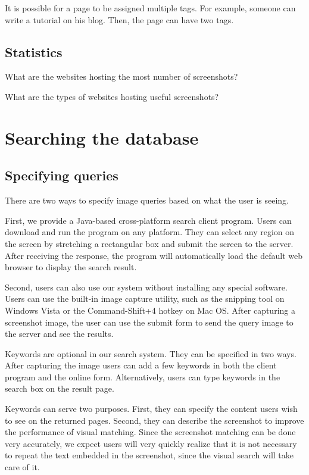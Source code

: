 \documentclass{www2010-submission}
\begin{document}
It is possible for a page to be assigned multiple tags. For
example, someone can write a tutorial on his blog. Then, the page
can have two tags.

\subsection{Statistics}

What are the websites hosting the most number of screenshots?

What are the types of websites hosting useful screenshots?


\section{Searching the database}

\subsection{Specifying queries}

There are two ways to specify image queries based on what the user
is seeing.

First, we provide a Java-based cross-platform search client
program. Users can download and run the program on any platform.
They can select any region on the screen by stretching a
rectangular box and submit the screen to the server. After
receiving the response, the program will automatically load the
default web browser to display the search result.

Second, users can also use our system without installing any
special software. Users can use the built-in image capture
utility, such as the snipping tool on Windows Vista or the
Command-Shift+4 hotkey on Mac OS. After capturing a screenshot
image, the user can use the submit form to send the query image to
the server and see the results.

Keywords are optional in our search system. They can be specified
in two ways. After capturing the image users can add a few
keywords in both the client program and the online form.
Alternatively, users can type keywords in the search box on the
result page.

Keywords can serve two purposes. First, they can specify the
content users wish to see on the returned pages. Second, they can
describe the screenshot to improve the performance of visual
matching. Since the screenshot matching can be done very
accurately, we expect users will very quickly realize that it is
not necessary to repeat the text embedded in the screenshot, since
the visual search will take care of it.
\end{document}
